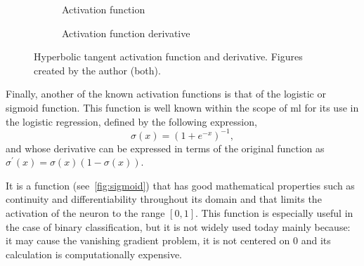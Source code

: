 \begin{figure}[ht]
  \centering
  \begin{subfigure}[b]{.375\textwidth}
    \centering
    \caption{Activation function}
  \end{subfigure}\hspace{3em}
  \begin{subfigure}[b]{.375\textwidth}
    \centering
    \caption{Activation function derivative}
  \end{subfigure}
  \caption[Hyperbolic tangent activation function]{Hyperbolic tangent
    activation function and derivative. Figures created by the author (both).}%
  \label{fig:tangent}
\end{figure}

Finally, another of the known activation functions is that of the
logistic or sigmoid function. This function is well known within the scope of \gls{ml} for its
use in the logistic regression, defined by the
following expression,
\begin{equation}
  \sigma(x) = {(1 + e^{-x})}^{-1},
\end{equation}
and whose derivative can be expressed in terms of the original function as
\(\sigma^\prime(x) = \sigma(x)(1 - \sigma(x))\).

It is a function (see\ \vref{fig:sigmoid}) that has good mathematical
properties such as continuity and differentiability throughout its domain and
that limits the activation of the neuron to the range \([0, 1]\). This function
is especially useful in the case of binary classification, but it is not widely
used today mainly because: it may cause the vanishing gradient problem, it is
not centered on \(0\) and its calculation is computationally expensive.

